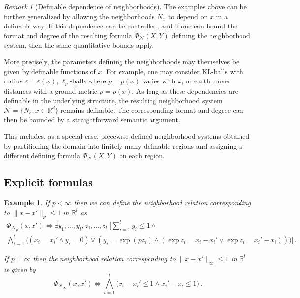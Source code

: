 \documentclass[11pt]{article}
\theoremstyle{plain}
\newtheorem{example}{Example}[section]
\theoremstyle{definition}
\theoremstyle{remark}
\newtheorem{remark}[theorem]{Remark}
\newcommand{\R}{\mathbb{R}}
\newcommand{\cN}{\mathcal{N}}
\begin{document}
\smallskip

\begin{remark}[Definable dependence of neighborhoods]
The examples above can be further generalized by allowing the neighborhoods
\(N_x\) to depend on \(x\) in a definable way. If this dependence can be
controlled, and if one can bound the format and degree of the resulting
formula \(\Phi_{\cN}(X,Y)\) defining the neighborhood system, then the same
quantitative bounds apply.

More precisely, the parameters defining the neighborhoods may themselves be
given by definable functions of \(x\). For example, one may consider
KL-balls with radius \(\varepsilon=\varepsilon(x)\), \(\ell_p\)-balls where
\(p=p(x)\) varies with \(x\), or earth mover distances with a ground metric
\(\rho=\rho(x)\). As long as these dependencies are definable in the
underlying structure, the resulting neighborhood system
\(\cN=\{N_x:x\in\R^d\}\) remains definable. The corresponding format and
degree can then be bounded by a straightforward semantic argument.

This includes, as a special case, piecewise-defined neighborhood systems
obtained by partitioning the domain into finitely many definable regions and
assigning a different defining formula \(\Phi_{\cN}(X,Y)\) on each region.
\end{remark}





\subsection{Explicit formulas}

\begin{example}
\label{app:example-lp-definability}
If \(p < \infty\) then we can define the neighborhood relation corresponding to \(\|x-x'\|_p\le 1\) in \(\mathbb R^l\) as
\begin{multline*}
 \Phi_{\mathcal N_p}(x,x') \iff
 \exists y_1,\dots,y_l,z_1,\dots,z_l \; \Bigg[
 \sum_{i=1}^l y_i \leq 1 \land \\ \bigwedge_{i=1}^l \bigl((x_i = x_i' \land y_i = 0) \lor (y_i = \exp (p z_i) \land (\exp z_i = x_i - x_i' \lor \exp z_i = x_i' - x_i))\bigr)
 \Bigg]\,.
\end{multline*}

If \(p = \infty\) then the neighborhood relation corresponding to \(\|x - x'\|_\infty \leq 1\) in \(\mathbb R^l\) is given by
\[
 \Phi_{\mathcal N_\infty}(x,x') \iff \bigwedge_{i=1}^l \bigl( x_i - x_i' \le 1 \land x_i' - x_i \le 1 \bigr)\,.
\]
\end{example}
\end{document}
